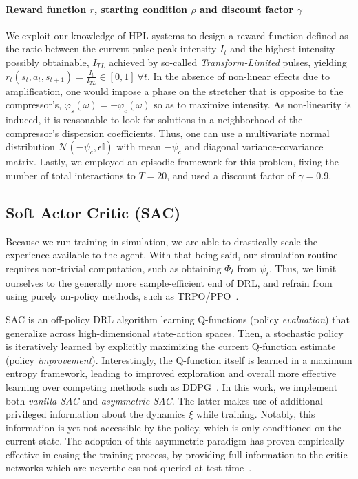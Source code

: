 \paragraph{Reward function \( r \), starting condition \( \rho \) and discount factor \( \gamma \)}
We exploit our knowledge of HPL systems to design a reward function defined as the ratio between the current-pulse peak intensity \( I_t \) and the highest intensity possibly obtainable, \( I_{TL} \) achieved by so-called \emph{Transform-Limited} pulses, yielding \(r_t(s_t, a_t, s_{t+1}) = \frac{I_t}{I_{TL}} \in [0,1] \ \forall t \). In the absence of non-linear effects due to amplification, one would impose a phase on the stretcher that is opposite to the compressor's, \( \varphi_s(\omega) = - \varphi_c(\omega) \) so as to maximize intensity. As non-linearity is induced, it is reasonable to look for solutions in a neighborhood of the compressor's dispersion coefficients. Thus, one can use a multivariate normal distribution \( \mathcal N(-\psi_c, \epsilon \mathbb I) \) with mean \( -\psi_c \) and diagonal variance-covariance matrix. Lastly, we employed an episodic framework for this problem, fixing the number of total interactions to \( T=20 \), and used a discount factor of \( \gamma=0.9 \).

\subsection{Soft Actor Critic (SAC)}
Because we run training in simulation, we are able to drastically scale the experience available to the agent. With that being said, our simulation routine requires non-trivial computation, such as obtaining \( \Phi_t \) from \( \psi_t \). Thus, we limit ourselves to the generally more sample-efficient end of DRL, and refrain from using purely on-policy methods, such as TRPO/PPO~\citep{schulman2015trust, schulman2017proximal}.

SAC is an off-policy DRL algorithm learning Q-functions (policy \textit{evaluation}) that generalize across high-dimensional state-action spaces. Then, a stochastic policy is iteratively learned by explicitly maximizing the current Q-function estimate (policy \textit{improvement}). 
Interestingly, the Q-function itself is learned in a maximum entropy framework, leading to improved exploration and overall more effective learning over competing methods such as DDPG~\citep{haarnoja2018soft}. In this work, we implement both \emph{vanilla-SAC} and \emph{asymmetric-SAC}. The latter makes use of additional privileged information about the dynamics \( \xi \) while training. Notably, this information is yet not accessible by the policy, which is only conditioned on the current state.
The adoption of this asymmetric paradigm has proven empirically effective in easing the training process, by providing full information to the critic networks which are nevertheless not queried at test time~\citep{akkaya2019solving}.

